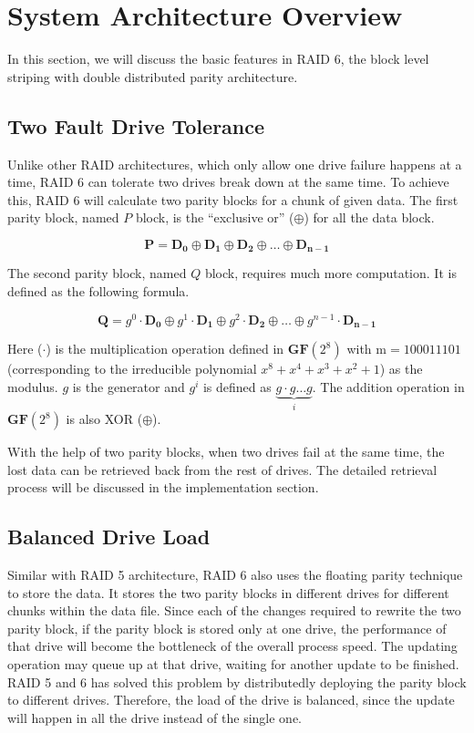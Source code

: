 \section{System Architecture Overview}

In this section, we will discuss the basic features in RAID 6, the block level striping with double distributed parity architecture.

\subsection{Two Fault Drive Tolerance}
Unlike other RAID architectures, which only allow one drive failure happens at a time, RAID 6 can tolerate two drives break down at the same time. To achieve this, RAID 6 will calculate two parity blocks for a chunk of given data. The first parity block, named $P$ block, is the ``exclusive or'' ($\oplus$) for all the data block. 

\begin{equation}\label{eq:gen_p}
	\mathbf{P = D_0 \oplus D_1 \oplus D_2 \oplus \ldots \oplus D_{n-1}}
\end{equation}

The second parity block, named $Q$ block, requires much more computation. It is defined as the following formula.

\begin{equation}\label{eq:gen_q}
	\mathbf{Q} = g^0\cdot \mathbf{D_0} \oplus g^1\cdot \mathbf{D_1} \oplus g^2\cdot \mathbf{D_2} \oplus \ldots \oplus g^{n-1}\cdot \mathbf{D_{n-1}}
\end{equation}

Here ($\cdot$) is the multiplication operation defined in $\mathbf{GF}(2^8)$ with $\mathrm{m}=100011101$ (corresponding to the irreducible polynomial $x^8+x^4+x^3+x^2+1$) as the modulus. $g$ is the generator and $g^{i}$ is defined as $\underbrace{g\cdot g\ldots g}_{i}$. The addition operation in $\mathbf{GF}(2^8)$ is also XOR ($\oplus$).

With the help of two parity blocks, when two drives fail at the same time, the lost data can be retrieved back from the rest of drives. The detailed retrieval process will be discussed in the implementation section.


\subsection{Balanced Drive Load}
Similar with RAID 5 architecture, RAID 6 also uses the floating parity technique to store the data. It stores the two parity blocks in different drives for different chunks within the data file. Since each of the changes required to rewrite the two parity block, if the parity block is stored only at one drive, the performance of that drive will become the bottleneck of the overall process speed. The updating operation may queue up at that drive, waiting for another update to be finished. RAID 5 and 6 has solved this problem by distributedly deploying the parity block to different drives. Therefore, the load of the drive is balanced, since the update will happen in all the drive instead of the single one.


